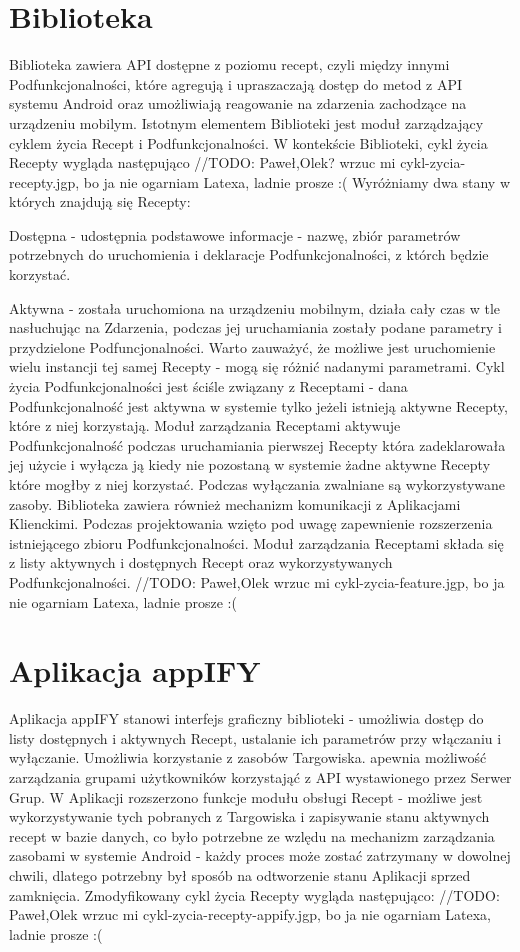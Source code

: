 \documentclass[11pt,a4paper,polish,thesis]{dcsbook}
\begin{document}
\section{Biblioteka}
Biblioteka zawiera API dostępne z poziomu recept, czyli między innymi Podfunkcjonalności, które agregują i upraszaczają dostęp do metod z API systemu Android oraz umożliwiają reagowanie na zdarzenia zachodzące na urządzeniu mobilym.
Istotnym elementem Biblioteki jest moduł zarządzający cyklem życia Recept i Podfunkcjonalności. W kontekście Biblioteki, cykl życia Recepty wygląda następująco
//TODO: Paweł,Olek? wrzuc mi cykl-zycia-recepty.jgp, bo ja nie ogarniam Latexa, ladnie prosze :(
Wyróżniamy dwa stany w których znajdują się Recepty:
\item Dostępna - udostępnia podstawowe informacje - nazwę, zbiór parametrów potrzebnych do uruchomienia i deklaracje Podfunkcjonalności, z którch będzie korzystać.
\item Aktywna - została uruchomiona na urządzeniu mobilnym, działa cały czas w tle nasłuchując na Zdarzenia, podczas jej uruchamiania zostały podane parametry i przydzielone Podfuncjonalności.
Warto zauważyć, że możliwe jest uruchomienie wielu instancji tej samej Recepty - mogą się różnić nadanymi parametrami.
Cykl życia Podfunkcjonalności jest ściśle związany z Receptami - dana Podfunkcjonalność jest aktywna w systemie tylko jeżeli istnieją aktywne Recepty, które z niej korzystają. 
Moduł zarządzania Receptami aktywuje Podfunkcjonalność podczas uruchamiania pierwszej Recepty która zadeklarowała jej użycie i wyłącza ją kiedy nie pozostaną w systemie żadne aktywne Recepty które mogłby z niej korzystać.
Podczas wyłączania zwalniane są wykorzystywane zasoby. Biblioteka zawiera również mechanizm komunikacji z Aplikacjami Klienckimi. Podczas projektowania wzięto pod uwagę zapewnienie rozszerzenia istniejącego zbioru Podfunkcjonalności.
Moduł zarządzania Receptami składa się z listy aktywnych i dostępnych Recept oraz wykorzystywanych Podfunkcjonalności.
//TODO: Paweł,Olek wrzuc mi cykl-zycia-feature.jgp, bo ja nie ogarniam Latexa, ladnie prosze :(

\section{Aplikacja appIFY}
Aplikacja appIFY stanowi interfejs graficzny biblioteki - umożliwia dostęp do listy dostępnych i aktywnych Recept, ustalanie ich parametrów przy włączaniu i wyłączanie. Umożliwia korzystanie z zasobów Targowiska. apewnia możliwość zarządzania grupami użytkowników korzystająć z API wystawionego przez Serwer Grup.
W Aplikacji rozszerzono funkcje modułu obsługi Recept - możliwe jest wykorzystywanie tych pobranych z Targowiska i zapisywanie stanu aktywnych recept w bazie danych, co było potrzebne ze wzlędu na mechanizm zarządzania zasobami w systemie Android - każdy proces może zostać zatrzymany w dowolnej chwili, dlatego potrzebny był sposób na odtworzenie stanu Aplikacji sprzed zamknięcia. Zmodyfikowany cykl życia Recepty wygląda następująco:
 //TODO: Paweł,Olek wrzuc mi cykl-zycia-recepty-appify.jgp, bo ja nie ogarniam Latexa, ladnie prosze :(
\end{document}
